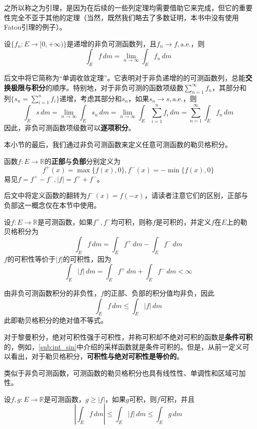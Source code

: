 之所以称之为引理，是因为在后续的一些列定理均需要借助它来完成，但它的重要性完全不亚于其他的定理（当然，既然我们略去了多数证明，本书中没有使用Fatou引理的例子）。

\begin{theorem}[Levi单调收敛定理]
    设$\{f_n:E\to[0,+\infty)\}$是递增的非负可测函数列，且$f_n\to f,\text{a.e.}$，则
    \[\int_{E}f\,dm=\lim_{n\to\infty}\int_{E}f_n\,dm\]
\end{theorem}
后文中将它简称为“单调收敛定理”。它表明对于非负递增的的可测函数列，总能\textbf{交换极限与积分}的顺序。特别地，对于非负可测的函数项级数$\sum_{n=1}^{\infty}f_n$，其部分和列$\{s_n=\sum_{i=1}^{n}f_i\}$递增，考虑其部分和$s_n$，如果$s_n\to s,\text{a.e.}$，则
\[\int_{E}s\,dm=\lim_{n\to\infty}\int_{E}s_n\,dm=\lim_{n\to\infty}\int_{E}\sum_{i=1}^{n}f_i\,dm=\sum_{n=1}^{\infty}\int_{E}f_n\,dm\]
因此，非负可测函数项级数可以\textbf{逐项积分}。

本小节的最后，我们通过非负可测函数来定义任意可测函数的勒贝格积分。

\begin{definition}[函数的正部与负部]
    函数$f:E\to\mathbb{R}$的\textbf{正部}与\textbf{负部}分别定义为$$f^+(x)=\max\{f(x),0\},f^-(x)=-\min\{f(x),0\}$$
    易见$f=f^+-f^-,|f|=f^++f^-$。
\end{definition}
后文中将定义函数的翻转为$f^-(x)=f(-x)$，请读者注意它们的区别，正部与负部这一概念仅在本节中使用。

\begin{definition}[可测函数的勒贝格积分]
    设$f:E\to\mathbb{R}$是可测函数，如果$f^+,f^-$均可积，则称$f$是可积的，并定义$f$在$E$上的勒贝格积分为
    \[\int_{E}f\,dm=\int_{E}f^+\,dm-\int_{E}f^-\,dm\]
    $f$的可积性等价于$|f|$的可积性，因为
    \[\int_{E}|f|\,dm=\int_{E}f^+\,dm+\int_{E}f^-\,dm<\infty\]
\end{definition}

由非负可测函数积分的非负性，$f$的正部、负部的积分值均非负，因此
\[\int_{E}f\,dm\leq \int_{E}|f|\,dm\]
此即勒贝格积分的绝对值不等式。

对于黎曼积分，绝对可积性强于可积性，并称可积却不绝对可积的函数是\textbf{条件可积}的，例如，\ref{sub:int_sin}中介绍的采样函数就是条件可积的。但是，从前一定义可以看出，对于勒贝格积分，\textbf{可积性与绝对可积性是等价的}。

类似于非负可测函数，可测函数的勒贝格积分也具有线性性、单调性和区域可加性。

\begin{theorem}[比较判别法]
    设$f,g:E\to\mathbb{R}$是可测函数，$g\geq|f|$，如果$g$可积，则$f$可积，并且
    \[\left|\int_{E}f\,dm\right|\leq \int_{E}|f|\,dm\leq \int_{E}g\,dm\]
\end{theorem}

